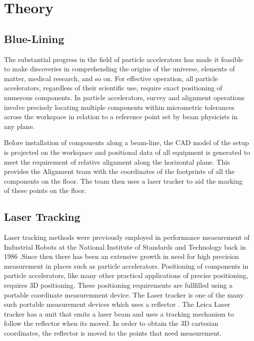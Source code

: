 \documentclass{LTHthesis}
\begin{document}
\chapter{Theory}
    \section{Blue-Lining} \label{bluelining}
        The substantial progress in the field of particle accelerators has made it feasible to make discoveries in comprehending the origins of the universe, elements of matter, medical research, and so on. For effective operation, all particle accelerators, regardless of their scientific use, require exact positioning of numerous components. In particle accelerators, survey and alignment operations involve precisely locating multiple components within micrometric tolerances across the workspace in relation to a reference point set by beam physicists in any plane. 
        
        Before installation of components along a beam-line, the CAD model of the setup is projected on the workspace and positional data of all equipment is generated to meet the requirement of relative alignment along the horizontal plane. This provides the Alignment team with the coordinates of the footprints of all the components on the floor. The team then uses a laser tracker to aid the marking of these points on the floor.
    \section{Laser Tracking} \label{laser tracking}
        Laser tracking methods were previously employed in performance measurement of Industrial Robots at the National Institute of Standards and Technology back in 1986 .Since then there has been an extensive growth in need for high precision measurement in places such as particle accelerators. Positioning of components in particle accelerators, like many other practical applications of precise positioning, requires 3D positioning. These positioning requirements are fullfilled using a portable coordinate measuremnent device. The Laser tracker is one of the many such portable measurement devices which uses a reflector . The Leica Laser tracker  has a unit that emits a laser beam and uses a tracking mechanism to follow the reflector when its moved. In order to obtain the 3D cartesian coordinates, the reflector is moved to the points that need measurement.
        
\end{document}
